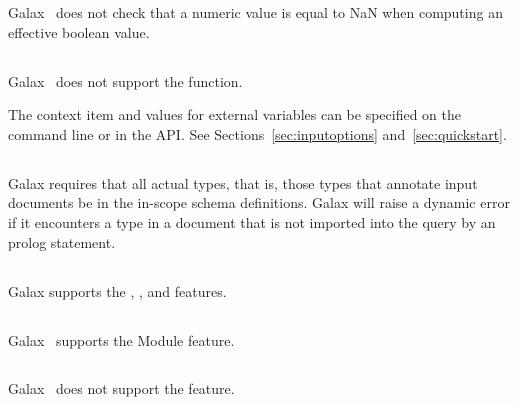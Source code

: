    Galax \version\ does not check that a numeric value is equal to NaN
   when computing an effective boolean value.

\subsection*{}

   Galax \version\ does not support the  function.
 
   The context item and values for external variables can be specified
   on the command line or in the API.  See
   Sections~\ref{sec:inputoptions} and~\ref{sec:quickstart}.

\subsection*{}

Galax requires that all actual types, that is, those types that annotate
input documents be in the in-scope schema definitions.   Galax
will raise a dynamic error if it encounters a type in a document that
is not imported into the query by an  prolog statement.

\subsection*{}

Galax supports the , , and
 features. 

\subsection*{}

   Galax \version\ supports the Module feature.

\subsection*{}

   Galax \version\ does not support the  feature.

